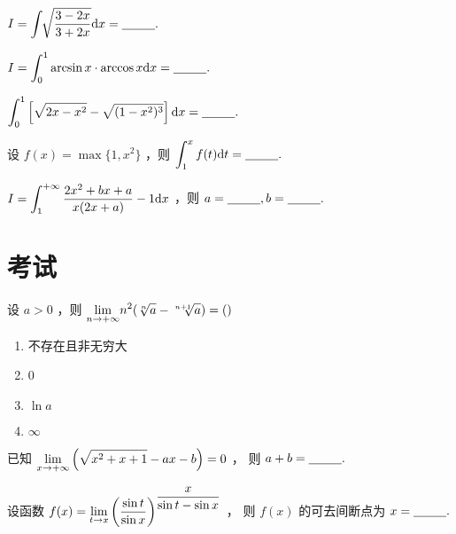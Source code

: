\begin{quest}[660T52]
    $ \displaystyle I = \int \displaystyle\sqrt[]{\dfrac{3-2x}{3+2x}}\mathrm{d}x = \underline{~~~~~~~~}. $ 
\end{quest}

\begin{quest}[660T59]
    $ \displaystyle I = \int_0^1 \arcsin x \cdot \arccos x \mathrm{d}x =\underline{~~~~~~~~}. $ 
\end{quest}

\begin{quest}[660T60]
    $ \displaystyle \int_0^1\left[\sqrt{2x-x^2}-\sqrt{(1-x^2)^3}\right]\mathrm{d}x = \underline{~~~~~~~~}. $ 
\end{quest}

\begin{quest}[660T64]
    设 $ f(x) = \max \{1,x^2\} $ ，则 $ \displaystyle \int_1^x f(t)\mathrm{d}t = \underline{~~~~~~~~}. $ 
\end{quest}

\begin{quest}[660T68]
    $ \displaystyle I = \int_1^{+\infty} \dfrac{2x^2+bx+a}{x(2x+a)}-1\mathrm{d}x $ ，则 $ a = \underline{~~~~~~~~},b = \underline{~~~~~~~~}. $ 
\end{quest}


\section{考试}
\begin{Quest}[C1T5\goto{T1}]
    设 $ a>0 $ ，则 $\displaystyle {\displaystyle\lim_{n\rightarrow +\infty}}n^2(\sqrt[n]a-\sqrt[n+1]a)=() $

    \begin{enumerate}
        \item 不存在且非无穷大
        \item 0
        \item $ \ln a $ 
        \item $ \infty $ 
    \end{enumerate}
\end{Quest}

\begin{Quest}[C1T11\goto{T2}]
    已知 $ {\displaystyle\lim_{x\rightarrow +\infty}}\left(\displaystyle\sqrt{x^2+x+1}-ax-b\right)=0 $ ，
    则 $ a+b=\underline{~~~~~~~~}. $ 
\end{Quest}

\begin{Quest}[C1T12\goto{T3}]
    设函数 $\displaystyle f(x) = {\displaystyle\lim_{t\rightarrow x}}
    \left(\frac{\sin t}{\sin x}\right)^{\displaystyle \frac{x}{\sin t-\sin x}} $ ，
    则 $ f(x) $ 的可去间断点为 $ x=\underline{~~~~~~~~}. $ 
\end{Quest}

